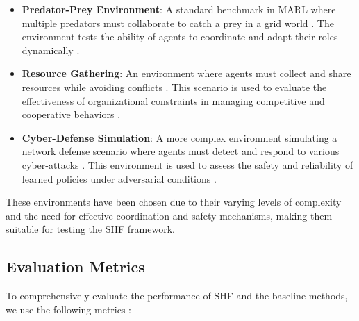 \documentclass[sigconf,anonymous]{aamas}
\begin{document}
\begin{itemize}
    \item \textbf{Predator-Prey Environment}: A standard benchmark in MARL where multiple predators must collaborate to catch a prey in a grid world \cite{foerster2016learning}. The environment tests the ability of agents to coordinate and adapt their roles dynamically \cite{foerster2018counterfactual}.
    \item \textbf{Resource Gathering}: An environment where agents must collect and share resources while avoiding conflicts \cite{foerster2018counterfactual}. This scenario is used to evaluate the effectiveness of organizational constraints in managing competitive and cooperative behaviors \cite{hubner2010moise}.
    \item \textbf{Cyber-Defense Simulation}: A more complex environment simulating a network defense scenario where agents must detect and respond to various cyber-attacks \cite{bastani2018verifiable}. This environment is used to assess the safety and reliability of learned policies under adversarial conditions \cite{wei2019safe}.
\end{itemize}


These environments have been chosen due to their varying levels of complexity and the need for effective coordination and safety mechanisms, making them suitable for testing the SHF framework.

\subsection{Evaluation Metrics}
To comprehensively evaluate the performance of SHF and the baseline methods, we use the following metrics \cite{hubner2010moise, soule2024}:
\end{document}
